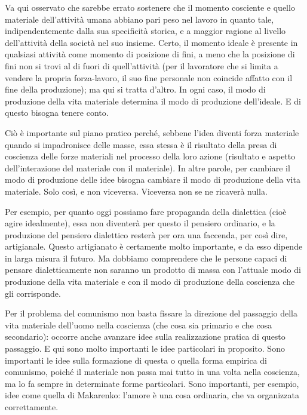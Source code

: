 \documentclass[../main]{subfiles}
\begin{document}
Va qui osservato che sarebbe errato sostenere che il momento cosciente e quello materiale dell'attività umana abbiano pari peso nel lavoro in quanto tale, indipendentemente dalla sua specificità storica, e a maggior ragione al livello dell'attività della società nel suo insieme. Certo, il momento ideale è presente in qualsiasi attività come momento di posizione di fini, a meno che la posizione di fini non si trovi al di fuori di quell'attività (per il lavoratore che si limita a vendere la propria forza-lavoro, il suo fine personale non coincide affatto con il fine della produzione); ma qui si tratta d'altro. In ogni caso, il modo di produzione della vita materiale determina il modo di produzione dell'ideale. E di questo bisogna tenere conto.

Ciò è importante sul piano pratico perché, sebbene l'idea diventi forza materiale quando si impadronisce delle masse, essa stessa è il risultato della presa di coscienza delle forze materiali nel processo della loro azione (risultato e aspetto dell'interazione del materiale con il materiale). In altre parole, per cambiare il modo di produzione delle idee bisogna cambiare il modo di produzione della vita materiale. Solo così, e non viceversa. Viceversa non se ne ricaverà nulla.

Per esempio, per quanto oggi possiamo fare propaganda della dialettica (cioè agire idealmente), essa non diventerà per questo il pensiero ordinario, e la produzione del pensiero dialettico resterà per ora una faccenda, per così dire, artigianale. Questo artigianato è certamente molto importante, e da esso dipende in larga misura il futuro. Ma dobbiamo comprendere che le persone capaci di pensare dialetticamente non saranno un prodotto di massa con l'attuale modo di produzione della vita materiale e con il modo di produzione della coscienza che gli corrisponde.

Per il problema del comunismo non basta fissare la direzione del passaggio della vita materiale dell'uomo nella coscienza (che cosa sia primario e che cosa secondario): occorre anche avanzare idee sulla realizzazione pratica di questo passaggio. E qui sono molto importanti le idee particolari in proposito. Sono importanti le idee sulla formazione di questa o quella forma empirica di comunismo, poiché il materiale non passa mai tutto in una volta nella coscienza, ma lo fa sempre in determinate forme particolari. Sono importanti, per esempio, idee come quella di Makarenko: l'amore è una cosa ordinaria, che va organizzata correttamente.
\end{document}
